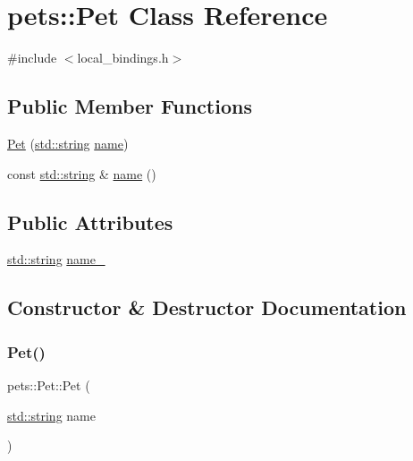 \hypertarget{classpets_1_1_pet}{}\section{pets\+::Pet Class Reference}
\label{classpets_1_1_pet}


{\ttfamily \#include $<$local\+\_\+bindings.\+h$>$}

\subsection*{Public Member Functions}
\begin{DoxyCompactItemize}
\item 
\mbox{\hyperlink{classpets_1_1_pet_aaa9d476ef2d620de878cc3e691f864d2}{Pet}} (\mbox{\hyperlink{_s_d_l__opengl__glext_8h_ab4ccfaa8ab0e1afaae94dc96ef52dde1}{std\+::string}} \mbox{\hyperlink{structname}{name}})
\item 
const \mbox{\hyperlink{_s_d_l__opengl__glext_8h_ab4ccfaa8ab0e1afaae94dc96ef52dde1}{std\+::string}} \& \mbox{\hyperlink{classpets_1_1_pet_ac3c9624914d359e198368489273ad629}{name}} ()
\end{DoxyCompactItemize}
\subsection*{Public Attributes}
\begin{DoxyCompactItemize}
\item 
\mbox{\hyperlink{_s_d_l__opengl__glext_8h_ab4ccfaa8ab0e1afaae94dc96ef52dde1}{std\+::string}} \mbox{\hyperlink{classpets_1_1_pet_ae5efab5a6ec6b610b8d807a36bb6c3a9}{name\+\_\+}}
\end{DoxyCompactItemize}


\subsection{Constructor \& Destructor Documentation}
\mbox{\label{classpets_1_1_pet_aaa9d476ef2d620de878cc3e691f864d2}} 
\subsubsection{\texorpdfstring{Pet()}{Pet()}}
{\footnotesize\ttfamily pets\+::\+Pet\+::\+Pet (\begin{DoxyParamCaption}\item[{\mbox{\hyperlink{_s_d_l__opengl__glext_8h_ab4ccfaa8ab0e1afaae94dc96ef52dde1}{std\+::string}}}]{name }\end{DoxyParamCaption})\hspace{0.3cm}{\ttfamily [inline]}}



